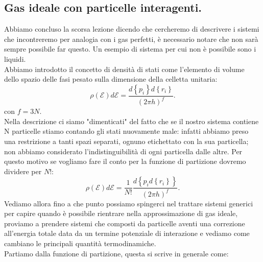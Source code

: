 \subsection{Gas ideale con particelle interagenti.}%
Abbiamo concluso la scorsa lezione dicendo che cercheremo di descrivere i sistemi che incontreremo per analogia con i gas perfetti, è necessario notare che non sarà sempre possibile far questo. Un esempio di sistema per cui non è possibile sono i liquidi.\\
Abbiamo introdotto il concetto di densità di stati come l'elemento di volume dello spazio delle fasi pesato sulla dimensione della celletta unitaria:
\[
	\rho\left( \mathcal{E} \right) d\mathcal{E} = \frac{d\left\{ p_{i} \right\}d\left\{ r_{i} \right\}   }{\left( 2\pi h \right)^{f}}
.\] 
con $f = 3N$.\\
Nella descrizione ci siamo "dimenticati" del fatto che se il nostro sistema contiene N particelle stiamo contando gli stati nuovamente male: infatti abbiamo preso una restrizione a tanti spazi separati, ognuno etichettato con la sua particella; non abbiamo considerato l'indistinguibilità di ogni particella dalle altre. Per questo motivo se vogliamo fare il conto per la funzione di partizione dovremo dividere per $N!$:
\[
	\rho\left( \mathcal{E} \right) d\mathcal{E} =\frac{1}{N!} \frac{d\left\{ p_{i} d\left\{ r_{i} \right\}  \right\} }{\left( 2\pi h \right)^{f}}
.\]
Vediamo allora fino a che punto possiamo spingerci nel trattare sistemi generici per capire quando è possibile rientrare nella approssimazione di gas ideale, proviamo a prendere sistemi che composti da particelle aventi una correzione all'energia totale data da un termine potenziale di interazione e vediamo come cambiano le principali quantità termodinamiche.\\
Partiamo dalla funzione di partizione, questa si scrive in generale come:

